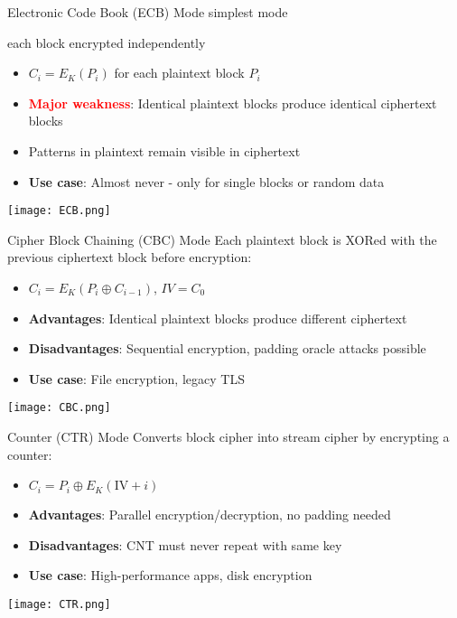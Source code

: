 \begin{definition}{Electronic Code Book (ECB) Mode} simplest mode

    each block encrypted independently
\begin{itemize}
    \item \normalsize $C_i = E_K(P_i)$ for each plaintext block $P_i$ \small
    \item \textcolor{red}{\textbf{Major weakness}}: Identical plaintext blocks produce identical ciphertext blocks
    \item Patterns in plaintext remain visible in ciphertext
    \item \textbf{Use case}: Almost never - only for single blocks or random data
\end{itemize}
\texttt{[image: ECB.png]}
\end{definition}

\begin{definition}{Cipher Block Chaining (CBC) Mode}
Each plaintext block is XORed with the previous ciphertext block before encryption:
\begin{itemize}
    \item \normalsize $C_i = E_K(P_i \oplus C_{i-1})$, $IV = C_0$ \small
    \item \textbf{Advantages}: Identical plaintext blocks produce different ciphertext
    \item \textbf{Disadvantages}: Sequential encryption, padding oracle attacks possible
    \item \textbf{Use case}: File encryption, legacy TLS 
\end{itemize}
\texttt{[image: CBC.png]}
\end{definition}

\begin{definition}{Counter (CTR) Mode}
Converts block cipher into stream cipher by encrypting a counter:
\begin{itemize}
    \item \normalsize $C_i = P_i \oplus E_K(\text{IV} + i)$ \small
    \item \textbf{Advantages}: Parallel encryption/decryption, no padding needed
    \item \textbf{Disadvantages}: CNT must never repeat with same key
    \item \textbf{Use case}: High-performance apps, disk encryption
\end{itemize}
\texttt{[image: CTR.png]}
\end{definition}

